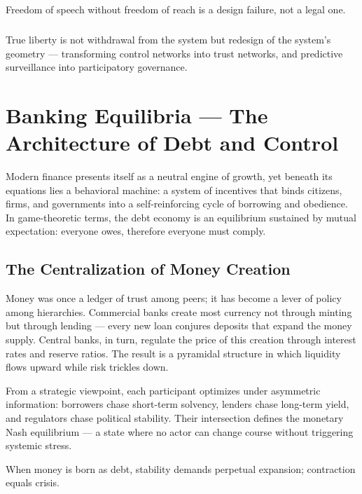 \documentclass[12pt,twoside]{book}
\begin{document}
\begin{keyidea}
Freedom of speech without freedom of reach is a design failure, not a legal one.
\end{keyidea}

\paragraph{}
True liberty is not withdrawal from the system but redesign of the system’s geometry --- transforming control networks into trust networks, and predictive surveillance into participatory governance.
\chapter{Banking Equilibria — The Architecture of Debt and Control}

Modern finance presents itself as a neutral engine of growth, yet beneath its equations lies a
behavioral machine: a system of incentives that binds citizens, firms, and governments into a
self-reinforcing cycle of borrowing and obedience.  
In game-theoretic terms, the debt economy is an equilibrium sustained by mutual expectation:
everyone owes, therefore everyone must comply.

\section{The Centralization of Money Creation}

Money was once a ledger of trust among peers; it has become a lever of policy among hierarchies.  
Commercial banks create most currency not through minting but through lending --- every new loan conjures deposits that expand the money supply.  
Central banks, in turn, regulate the price of this creation through interest rates and reserve ratios.
The result is a pyramidal structure in which liquidity flows upward while risk trickles down.

From a strategic viewpoint, each participant optimizes under asymmetric information:
borrowers chase short-term solvency, lenders chase long-term yield, and regulators chase
political stability.  
Their intersection defines the monetary Nash equilibrium --- a state where no actor can change course without triggering systemic stress.\\

\begin{keyidea}
When money is born as debt, stability demands perpetual expansion; contraction equals crisis.
\end{keyidea}
\end{document}

